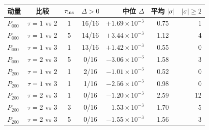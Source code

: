 \documentclass[UTF8,a4paper,11pt]{ctexart}
\begin{document}
\begin{center}
\footnotesize
\begin{tabular}{@{}lcccrcr@{}}
\toprule
动量 & 比较 & $\tau_{\rm ins}$ & $\Delta>0$ & 中位 $\Delta$ & 平均 $|\sigma|$ & $|\sigma|\ge2$ \\
\midrule
$P_{000}$ & $\tau=1$ vs $2$ & 1 & 16/16 & $+1.69\times10^{-3}$ & 0.75 & 1 \\
$P_{000}$ & $\tau=1$ vs $2$ & 5 & 14/16 & $+3.44\times10^{-3}$ & 1.12 & 4 \\
$P_{000}$ & $\tau=1$ vs $3$ & 1 & 13/16 & $+1.42\times10^{-3}$ & 0.55 & 0 \\
$P_{000}$ & $\tau=2$ vs $3$ & 5 & 0/16 & $-3.06\times10^{-3}$ & 1.58 & 3 \\
$P_{200}$ & $\tau=1$ vs $2$ & 1 & 2/16 & $-1.01\times10^{-3}$ & 0.52 & 0 \\
$P_{200}$ & $\tau=1$ vs $3$ & 1 & 1/16 & $-2.56\times10^{-3}$ & 0.98 & 0 \\
$P_{200}$ & $\tau=2$ vs $3$ & 1 & 0/16 & $-1.20\times10^{-3}$ & 2.59 & 12 \\
$P_{200}$ & $\tau=2$ vs $3$ & 3 & 0/16 & $-1.53\times10^{-3}$ & 1.70 & 5 \\
$P_{200}$ & $\tau=2$ vs $3$ & 5 & 0/16 & $-1.55\times10^{-3}$ & 1.56 & 3 \\
\bottomrule
\end{tabular}
\end{center}
\end{document}
